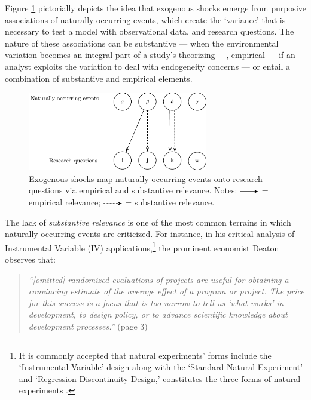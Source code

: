 \begin{refsection}
Figure \ref{fig:event_rq_mapping} pictorially depicts the idea that exogenous 
shocks emerge from purposive associations of naturally-occurring events, which
create the `variance' that is necessary to test a model with observational data,
and research questions. The nature of these associations can be substantive 
--- when the environmental variation becomes an integral part of a study's 
theorizing ---, empirical --- if an analyst exploits the variation to deal with
endogeneity concerns --- or entail a combination of substantive and
empirical elements.

\begin{figure}[!htbp]
  \centering
  \includegraphics[width=0.7\textwidth]{exhibits/event_rq_mapping.pdf}
  \caption{Exogenous shocks map naturally-occurring events onto 
  research questions via empirical and substantive relevance. Notes:
  \includegraphics[width=0.075\textwidth]{exhibits/event_rq_mapping_0.pdf}
  = empirical relevance; 
  \includegraphics[width=0.075\textwidth]{exhibits/event_rq_mapping_1.pdf}
   = substantive relevance.}
  \label{fig:event_rq_mapping}
\end{figure}

The lack of \textit{substantive relevance} is one of the most common terrains in which
naturally-occurring events are criticized. For instance, in his critical
analysis of Instrumental Variable (IV) applications,\footnote{It is commonly
accepted that natural experiments' forms include the `Instrumental Variable'
design along with the `Standard Natural Experiment' and `Regression
Discontinuity Design,'  constitutes the three forms of natural experiments
\parencite{sieweke_santoni_2020,dunning_2012}.} the prominent economist
Deaton \parencite*{deaton_2009} observes that:

\begin{quote}
\textit{
  ``[omitted] randomized evaluations of projects are useful for obtaining a convincing
  estimate of the average effect of a program or project. The price for this
  success is a focus that is too narrow to tell us `what works' in development,
  to design policy, or to advance scientific knowledge about development
  processes.''
  }
  (page 3)
\end{quote}


\end{refsection}
